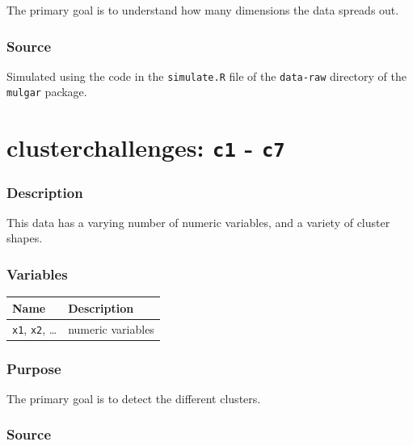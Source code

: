 \documentclass[
  letterpaper,
]{krantz}
\newcounter{none} %
\begin{document}
The primary goal is to understand how many dimensions the data spreads
out.

\subsubsection*{Source}\label{source-9}

Simulated using the code in the \texttt{simulate.R} file of the
\texttt{data-raw} directory of the \texttt{mulgar} package.

\section{\texorpdfstring{clusterchallenges: \texttt{c1} -
\texttt{c7}}{clusterchallenges: c1 - c7}}\label{clusterchallenges-c1---c7}

\subsubsection*{Description}\label{description-10}

This data has a varying number of numeric variables, and a variety of
cluster shapes.

\subsubsection*{Variables}\label{variables-10}

{\def\LTcaptype{none} %
\begin{longtable}[]{@{}ll@{}}
\toprule\noalign{}
Name & Description \\
\midrule\noalign{}
\endhead
\bottomrule\noalign{}
\endlastfoot
\texttt{x1}, \texttt{x2}, \ldots{} & numeric variables \\
\end{longtable}
}

\subsubsection*{Purpose}\label{purpose-10}

The primary goal is to detect the different clusters.

\subsubsection*{Source}\label{source-10}
\end{document}
